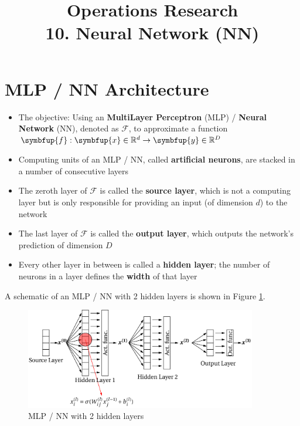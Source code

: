 \documentclass[11pt]{extarticle}
\newcommand{\vf}{\symbfup{f}}
\newcommand{\vx}{\symbfup{x}}
\newcommand{\vy}{\symbfup{y}}
\theoremstyle{definition}
\newcommand{\Ro}{\mathbb{R}}           	                %
\begin{document}
\title{\texorpdfstring{\vspace{15mm} Operations Research\\ 10. Neural Network (NN)}{Operations Research\\ 10. Neural Network (NN)}} 
\author{}
\date{}
\maketitle

\newpage

\section*{MLP / NN Architecture}

\begin{itemize}\setlength{\itemsep=0pt}
  \item The objective: Using an \textbf{MultiLayer Perceptron} (MLP) / \textbf{Neural Network} (NN), denoted as $\mathcal{F}$, to approximate a function $\vf:\vx\in\Ro^d\to\vy\in\Ro^D$ 
  \item Computing units of an MLP / NN, called \textbf{artificial neurons}, are stacked in a number of consecutive layers
  \item The zeroth layer of $\mathcal{F}$ is called the \textbf{source layer}, which is not a computing layer but is only responsible for providing an input (of dimension $d$) to the network
  \item The last layer of $\mathcal{F}$ is called the \textbf{output layer}, which outputs the network's prediction of dimension $D$
  \item Every other layer in between is called a \textbf{hidden layer}; the number of neurons in a layer defines the \textbf{width} of that layer
\end{itemize}
A schematic of an MLP / NN with 2 hidden layers is shown in Figure \ref{fig:MLP}. 

\begin{figure}[htbp]
  \begin{center}
    \includegraphics[width=0.9\textwidth]{fig/nn/MLP.pdf}
    \caption{MLP / NN with 2 hidden layers}
    \label{fig:MLP}
  \end{center}
\end{figure}
\end{document}
